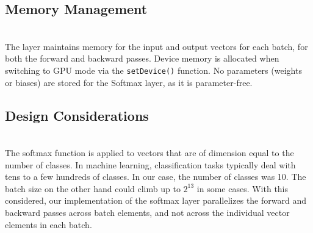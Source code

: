 \subsection{Memory Management}\\
    The layer maintains memory for the input and output vectors for each batch, for both the forward and backward passes. Device memory is allocated when switching to GPU mode via the \texttt{setDevice()} function. No parameters (weights or biases) are stored for the Softmax layer, as it is parameter-free.

\subsection{Design Considerations}\\
The softmax function is applied to vectors that are of dimension equal to the number of classes. In machine learning, classification tasks typically deal with tens to a few hundreds of classes. In our case, the number of classes was 10. The batch size on the other hand could climb up to $2^{13}$ in some cases. With this considered, our implementation of the softmax layer parallelizes the forward and backward passes across batch elements, and not across the individual vector elements in each batch.
